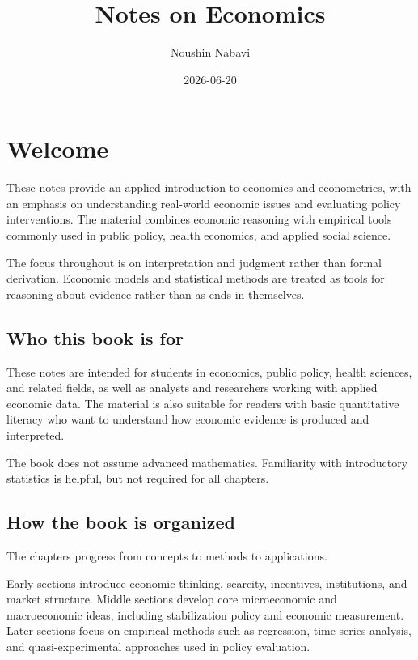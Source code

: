 \documentclass[
  11pt,
  oneside]{book}
\title{Notes on Economics}
\author{Noushin Nabavi}
\date{2026-06-20}
\begin{document}
\maketitle

{
\setcounter{tocdepth}{1}
\tableofcontents
}
\chapter{Welcome}\label{welcome}

These notes provide an applied introduction to economics and econometrics, with an emphasis on understanding real-world economic issues and evaluating policy interventions. The material combines economic reasoning with empirical tools commonly used in public policy, health economics, and applied social science.

The focus throughout is on interpretation and judgment rather than formal derivation. Economic models and statistical methods are treated as tools for reasoning about evidence rather than as ends in themselves.

\section{Who this book is for}\label{who-this-book-is-for}

These notes are intended for students in economics, public policy, health sciences, and related fields, as well as analysts and researchers working with applied economic data. The material is also suitable for readers with basic quantitative literacy who want to understand how economic evidence is produced and interpreted.

The book does not assume advanced mathematics. Familiarity with introductory statistics is helpful, but not required for all chapters.

\section{How the book is organized}\label{how-the-book-is-organized}

The chapters progress from concepts to methods to applications.

Early sections introduce economic thinking, scarcity, incentives, institutions, and market structure. Middle sections develop core microeconomic and macroeconomic ideas, including stabilization policy and economic measurement. Later sections focus on empirical methods such as regression, time-series analysis, and quasi-experimental approaches used in policy evaluation.
\end{document}
